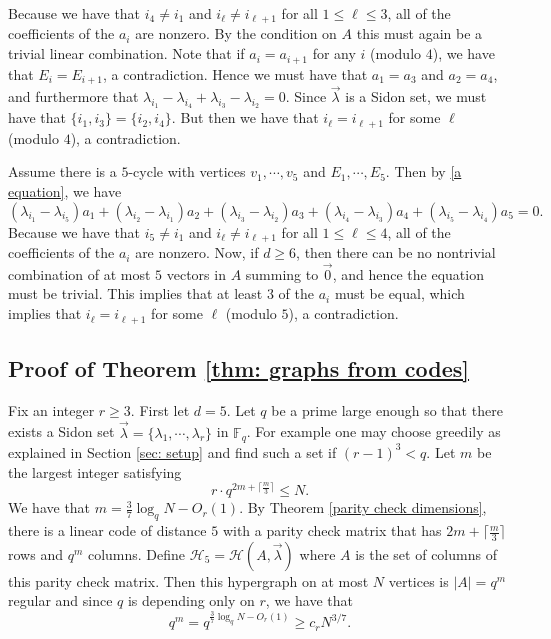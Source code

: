 \documentclass[12pt]{article}%
\begin{document}
Because we have that  $i_4\not = i_1$ and $i_\ell \not = i_{\ell+1}$ for all $1\leq \ell \leq 3$, all of the coefficients of the $a_i$ are nonzero. By the condition on $A$ this must again be a trivial linear combination. Note that if $a_i = a_{i+1}$ for any $i$ (modulo $4$), we have that $E_i = E_{i+1}$, a contradiction. Hence we must have that $a_1 = a_3$ and $a_2 = a_4$, and furthermore that $\lambda_{i_1} - \lambda_{i_4} + \lambda_{i_3} - \lambda_{i_2} = 0$. Since $\vec{\lambda}$ is a Sidon set, we must have that $\{i_1, i_3\} = \{i_2, i_4\}$. But then we have that $i_\ell = i_{\ell+1}$ for some $\ell$ (modulo $4$), a contradiction. 

\medskip {} Assume there is a $5$-cycle with vertices $v_1,\cdots, v_5$ and $E_1,\cdots, E_5$. Then by \eqref{a equation}, we have 
\[
(\lambda_{i_1} - \lambda_{i_5})a_1 + (\lambda_{i_2} - \lambda_{i_1})a_2 + (\lambda_{i_3} - \lambda_{i_2})a_3 + (\lambda_{i_4} - \lambda_{i_3})a_4 + (\lambda_{i_5 }- \lambda_{i_4})a_5 = 0.
\]
Because we have that  $i_5\not = i_1$ and $i_\ell \not = i_{\ell+1}$ for all $1\leq \ell \leq 4$, all of the coefficients of the $a_i$ are nonzero. Now, if $d\geq 6$, then there can be no nontrivial combination of at most $5$ vectors in $A$ summing to $\vec{0}$, and hence the equation must be trivial. This implies that at least $3$ of the $a_i$ must be equal, which implies that $i_\ell = i_{\ell+1}$ for some $\ell$ (modulo $5$), a contradiction.

\subsection{Proof of Theorem \ref{thm: graphs from codes}}

{Fix an integer $r \geq 3$.}
First let $d=5$. Let $q$ be a prime large enough so that there exists a Sidon set $ \vec{\lambda} = \{\lambda_1,\cdots, \lambda_r\}$ in $\mathbb{F}_q$. For example one may choose greedily as explained in Section \ref{sec: setup} and find such a set if $(r-1)^3 < q$.  Let $m$ be the largest integer satisfying 
\[
r\cdot q^{2m+\lceil \frac{m}{3}\rceil} \leq N. 
\]
We have that $m = \frac{3}{7}\log_q N - O_r(1)$. By Theorem \ref{parity check dimensions}, there is a linear code of distance $5$ with a parity check matrix that has $2m + \lceil \frac{m}{3}\rceil$ rows and $q^m$ columns. Define $\mathcal{H}_5 = \mathcal{H}(A, \vec{\lambda})$ where $A$ is the set of columns of this parity check matrix. Then this hypergraph on at most $N$ vertices is $|A| = q^m$ regular and since $q$ is depending only on $r$, we have that 
\[
q^m = q^{\frac{3}{7}\log_q N - O_r(1)} \geq c_r N^{3/7}.
\]
\end{document}
